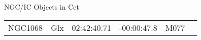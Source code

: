 \begin{block}{NGC/IC Objects in Cet}
  \centering
  \begin{tabularx}{\textwidth}{llrrll} \toprule 
    NGC1068 & Glx & 02:42:40.71 & -00:00:47.8  & M077 \\ 
  \end{tabularx}
\end{block}